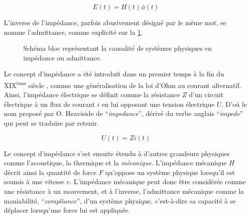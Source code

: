 \begin{equation}
	E(t) = H(t)\phi(t)
	\label{eq_impedance_gen}
\end{equation}

L'inverse de l'impédance, parfois abusivement désigné par le même mot, se nomme l'admittance, comme explicité sur la \cref{fig_impedance_physique}.

\begin{figure}[h]
	\centering
	\caption[Schéma bloc représentant la causalité de systèmes physiques en impédance ou admittance]{Schéma bloc représentant la causalité de systèmes physiques en impédance ou admittance.} %
	\label{fig_impedance_physique} %
\end{figure}

Le concept d'impédance a été introduit dans un premier temps à la fin du XIX\textsuperscript{ème} siècle \parencite{definition_impedance}, comme une généralisation de la loi d'Ohm au courant alternatif. Ainsi, l'impédance électrique se définit comme la résistance $Z$ d'un circuit électrique à un flux de courant $i$ en lui opposant une tension électrique $U$. D'où le nom proposé par O. Heaviside de \foreignquote{french}{\textit{impedance}}, dérivé du verbe anglais \foreignquote{french}{\textit{impede}} qui peut se traduire par retenir.

\begin{equation}
	U(t) = Z i(t)
	\label{eq_impedance_elec}
\end{equation}

Le concept d'impédance s'est ensuite étendu à d'autres grandeurs physiques comme l'acoustique, la thermique et la \emph{mécanique}. L'impédance mécanique $H$ décrit ainsi la quantité de force $F$ qu'oppose un système physique lorsqu'il est soumis à une vitesse $v$. L'impédance mécanique peut donc être considérée comme une résistance à un mouvement, et à l'inverse, l'admittance mécanique comme la maniabilité, \foreignquote{french}{\textit{compliance}}, d'un système physique, c'est-à-dire sa capacité à se déplacer lorsqu'une force lui est appliquée. 

